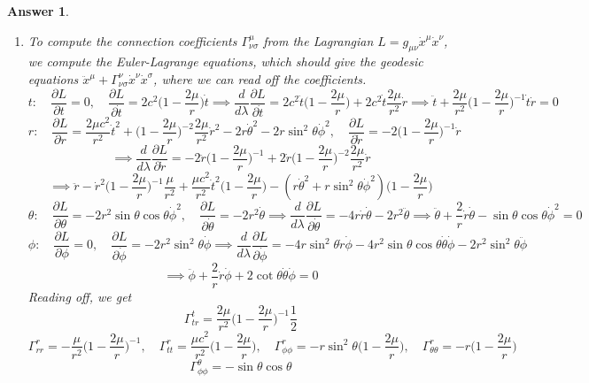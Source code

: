\documentclass[a4paper]{article}
\theoremstyle{new2}
\newtheorem{ans}{Answer}[section]
\theoremstyle{new}
\begin{document}
\begin{ans}\leavevmode
\begin{enumerate}[label=(\alph*)]
\item To compute the connection coefficients $\Gamma^\mu_{\nu\sigma}$ from the Lagrangian $L=g_{\mu\nu}\dot{x}^\mu\dot{x}^\nu$, we compute the Euler-Lagrange equations, which should give the geodesic equations $\ddot{x}^\mu+\Gamma_{\nu\sigma}^\nu\dot{x}^\nu\dot{x}^\sigma$, where we can read off the coefficients.
$$t:\quad\frac{\partial L}{\partial t}=0,\quad\frac{\partial L}{\partial\dot{t}}=2c^2\bigg(1-\frac{2\mu}{r}\bigg)\dot{t}\implies\frac{d}{d\lambda}\frac{\partial L}{\partial\dot{t}}=2c^2\ddot{t}\bigg(1-\frac{2\mu}{r}\bigg)+2c^2\dot{t}\frac{2\mu}{r^2}\dot{r}\implies\ddot{t}+\frac{2\mu}{r^2}\bigg(1-\frac{2\mu}{r}\bigg)^{-1}\dot{t}\dot{r}=0$$
$$r:\quad\frac{\partial L}{\partial r}=\frac{2\mu c^2}{r^2}\dot{t}^2+\bigg(1-\frac{2\mu}{r}\bigg)^{-2}\frac{2\mu}{r^2}\dot{r}^2-2r\dot{\theta}^2-2r\sin^2\theta\dot{\phi}^2,\quad\frac{\partial L}{\partial\dot{r}}=-2\bigg(1-\frac{2\mu}{r}\bigg)^{-1}\dot{r}$$
$$\implies\frac{d}{d\lambda}\frac{\partial L}{\partial\dot{r}}=-2\ddot{r}\bigg(1-\frac{2\mu}{r}\bigg)^{-1}+2\dot{r}\bigg(1-\frac{2\mu}{r}\bigg)^{-2}\frac{2\mu}{r^2}\dot{r}$$
$$\implies\ddot{r}-\dot{r}^2\bigg(1-\frac{2\mu}{r}\bigg)^{-1}\frac{\mu}{r^2}+\frac{\mu c^2}{r^2}\dot{t}^2\bigg(1-\frac{2\mu}{r}\bigg)-(r\dot{\theta}^2+r\sin^2\theta\dot{\phi}^2)\bigg(1-\frac{2\mu}{r}\bigg)$$
$$\theta:\quad\frac{\partial L}{\partial\theta}=-2r^2\sin\theta\cos\theta\dot{\phi}^2,\quad\frac{\partial L}{\partial\dot{\theta}}=-2r^2\dot{\theta}\implies\frac{d}{d\lambda}\frac{\partial L}{\partial\dot{\theta}}=-4r\dot{r}\dot{\theta}-2r^2\ddot{\theta}\implies\ddot{\theta}+\frac{2}{r}\dot{r}\dot{\theta}-\sin\theta\cos\theta\dot{\phi}^2=0$$
$$\phi:\quad\frac{\partial L}{\partial \phi}=0,\quad\frac{\partial L}{\partial\dot{\phi}}=-2r^2\sin^2\theta\dot{\phi}\implies\frac{d}{d\lambda}\frac{\partial L}{\partial\dot{\phi}}=-4r\sin^2\theta\dot{r}\dot{\phi}-4r^2\sin\theta\cos\theta\dot{\theta}\dot{\phi}-2r^2\sin^2\theta\ddot{\phi}$$
$$\implies\ddot{\phi}+\frac{2}{r}\dot{r}\dot{\phi}+2\cot\theta\dot{\theta}\dot{\phi}=0$$
Reading off, we get
$$\Gamma^t_{tr}=\frac{2\mu}{r^2}\bigg(1-\frac{2\mu}{r}\bigg)^{-1}\frac{1}{2}$$
$$\Gamma^r_{rr}=-\frac{\mu}{r^2}\bigg(1-\frac{2\mu}{r}\bigg)^{-1},\quad\Gamma^r_{tt}=\frac{\mu c^2}{r^2}\bigg(1-\frac{2\mu}{r}\bigg),\quad\Gamma^r_{\phi\phi}=-r\sin^2\theta\bigg(1-\frac{2\mu}{r}\bigg),\quad\Gamma^r_{\theta\theta}=-r\bigg(1-\frac{2\mu}{r}\bigg)$$
$$\Gamma^\theta_{\phi\phi}=-\sin\theta\cos\theta
$$
\end{enumerate}
\end{ans}
\end{document}
